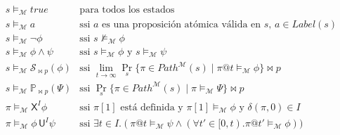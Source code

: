 \documentclass{article}
\begin{document}
\[
\begin{array}{ll}
s \models_\mathcal{M} \mathit{true} & \text{para todos los estados} \\
s \models_\mathcal{M} a & \text{ssi $a$ es una proposición atómica válida en $s$, $a \in Label(s)$} \\
s \models_\mathcal{M} \neg \phi & \text{ssi } s \not\models_\mathcal{M} \phi \\
s \models_\mathcal{M} \phi \land \psi & \text{ssi } s \models_\mathcal{M} \phi \text{ y } s \models_\mathcal{M} \psi \\
s \models_\mathcal{M} \mathcal{S}_{\bowtie p}(\phi) & \text{ssi } \lim_{t \to \infty} \Pr_s\{\pi \in Path^\mathcal{M}(s) \mid \pi@t \models_\mathcal{M} \phi \} \bowtie p \\
s \models_\mathcal{M} \mathbb{P}_{\bowtie p}(\Psi) & \text{ssi } \Pr_s\{\pi \in Path^\mathcal{M}(s) \mid \pi \models_\mathcal{M} \Psi\} \bowtie p \\
\pi \models_\mathcal{M} \mathsf{X}^I \phi & \text{ssi } \pi[1] \text{ está definida y } \pi[1] \models_\mathcal{M} \phi \text{ y } \delta(\pi, 0) \in I \\
\pi \models_\mathcal{M} \phi \, \mathsf{U}^I \psi & \text{ssi } \exists t \in I. (\pi@t \models_\mathcal{M} \psi \land (\forall t' \in [0,t). \pi@t' \models_\mathcal{M} \phi))
\end{array}
\]



\end{document}
